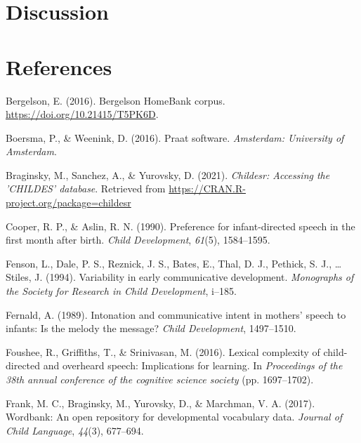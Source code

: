 \documentclass[10pt, letterpaper]{article}
\newenvironment{CSLReferences}%
  {}%
  {\par}
\begin{document}
\hypertarget{discussion}{%
\section{Discussion}\label{discussion}}

\hypertarget{references}{%
\section{References}\label{references}}

\setlength{\parindent}{-0.1in} 
\setlength{\leftskip}{0.125in}

\noindent

\hypertarget{refs}{}
\begin{CSLReferences}{1}{0}
\leavevmode\hypertarget{ref-bergelsoncorpus}{}%
Bergelson, E. (2016). Bergelson HomeBank corpus.
\url{https://doi.org/10.21415/T5PK6D}.

\leavevmode\hypertarget{ref-boersma2016praat}{}%
Boersma, P., \& Weenink, D. (2016). Praat software. \emph{Amsterdam:
University of Amsterdam}.

\leavevmode\hypertarget{ref-braginsky2021childesr}{}%
Braginsky, M., Sanchez, A., \& Yurovsky, D. (2021). \emph{Childesr:
Accessing the 'CHILDES' database}. Retrieved from
\url{https://CRAN.R-project.org/package=childesr}

\leavevmode\hypertarget{ref-cooper1990preference}{}%
Cooper, R. P., \& Aslin, R. N. (1990). Preference for infant-directed
speech in the first month after birth. \emph{Child Development},
\emph{61}(5), 1584--1595.

\leavevmode\hypertarget{ref-fenson1994variability}{}%
Fenson, L., Dale, P. S., Reznick, J. S., Bates, E., Thal, D. J.,
Pethick, S. J., \ldots{} Stiles, J. (1994). Variability in early
communicative development. \emph{Monographs of the Society for Research
in Child Development}, i--185.

\leavevmode\hypertarget{ref-fernald1989intonation}{}%
Fernald, A. (1989). Intonation and communicative intent in mothers'
speech to infants: Is the melody the message? \emph{Child Development},
1497--1510.

\leavevmode\hypertarget{ref-foushee2016lexical}{}%
Foushee, R., Griffiths, T., \& Srinivasan, M. (2016). Lexical complexity
of child-directed and overheard speech: Implications for learning. In
\emph{Proceedings of the 38th annual conference of the cognitive science
society} (pp. 1697--1702).

\leavevmode\hypertarget{ref-frank2017wordbank}{}%
Frank, M. C., Braginsky, M., Yurovsky, D., \& Marchman, V. A. (2017).
Wordbank: An open repository for developmental vocabulary data.
\emph{Journal of Child Language}, \emph{44}(3), 677--694.


\end{CSLReferences}
\end{document}
